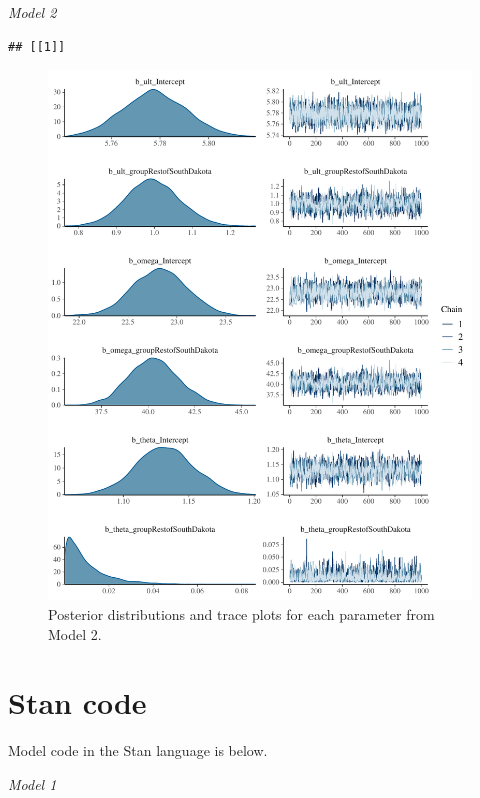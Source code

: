 \documentclass[
]{article}
\begin{document}
\emph{Model 2}

\begin{verbatim}
## [[1]]
\end{verbatim}

\begin{figure}
\centering
\includegraphics{test_files/figure-latex/unnamed-chunk-7-1.pdf}
\caption{\label{fig:unnamed-chunk-7}Posterior distributions and trace plots for each parameter from Model 2.}
\end{figure}

\hypertarget{stan-code}{%
\section{Stan code}\label{stan-code}}

Model code in the Stan language is below.

\emph{Model 1}
\end{document}
